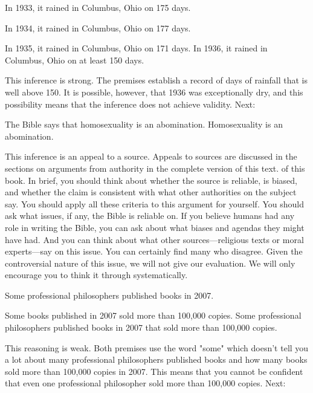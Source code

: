 \begin{earg*}
\item  In 1933, it rained in Columbus, Ohio on 175 days.
\item  In 1934, it rained in Columbus, Ohio on 177 days.
\item  In 1935, it rained in Columbus, Ohio on 171 days.
\itemc  In 1936, it rained in Columbus, Ohio on at least 150 days.
\end{earg*}

This inference is strong. The premises establish a record of days of rainfall that is well above 150. It is possible, however, that 1936 was exceptionally dry, and this possibility means that the inference does not achieve validity. Next:

\begin{earg*}
\item  The Bible says that homosexuality is an abomination.
\itemc  Homosexuality is an abomination.
\end{earg*}

This inference is an appeal to a source. Appeals to sources are discussed in the sections on arguments from authority in the complete version of this text. \label{ver_var}  of this book. In brief, you should think about whether the source is reliable, is biased, and whether the claim is consistent with what other authorities on the subject say. You should apply all these criteria to this argument for yourself. You should ask what issues, if any, the Bible is reliable on. If you believe humans had any role in writing the Bible, you can ask about what biases and agendas they might have had. And you can think about what other sources---religious texts or moral experts---say on this issue. You can certainly find many who disagree. Given the controversial nature of this issue, we will not give our evaluation. We will only encourage you to think it through systematically.


\begin{earg*}
\item  Some professional philosophers published books in 2007.
\item  Some books published in 2007 sold more than 100,000 copies.
\itemc  Some professional philosophers published books in 2007 that sold more than 100,000 copies.
\end{earg*}

This reasoning is weak. Both premises use the word "some" which doesn't tell you a lot about many professional philosophers published books and how many books sold more than 100,000 copies in 2007. This means that you cannot be confident that even one professional philosopher sold more than 100,000 copies. Next:


